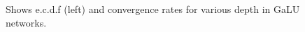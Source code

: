 \begin{figure}[h]
{\begin{tabular}{cc}
\end{tabular}
}
\caption{Shows e.c.d.f (left) and convergence rates for various depth in GaLU networks.}
\label{fig:galu-d}
\end{figure}


\FloatBarrier
\begin{figure}[h]
\end{figure}

